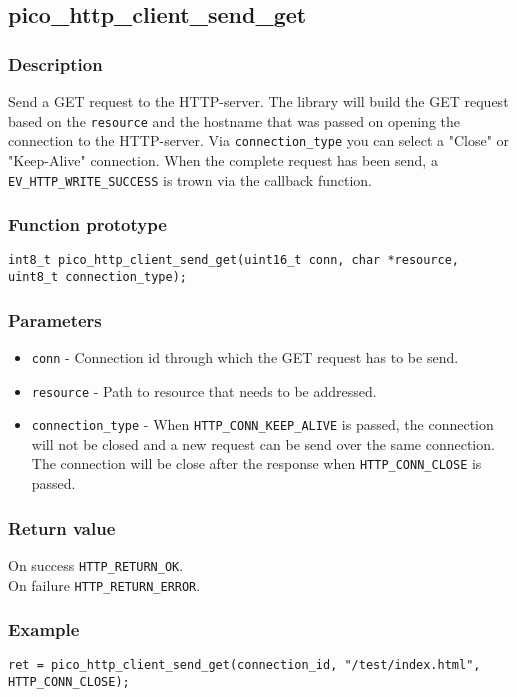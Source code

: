 \subsection{pico\_http\_client\_send\_get}
\subsubsection*{Description}
Send a GET request to the HTTP-server. The library will build the GET request based on the \texttt{resource} and the hostname that was passed on opening the connection to the HTTP-server. Via \texttt{connection\_type} you can select a "Close" or "Keep-Alive" connection. When the complete request has been send, a \texttt{EV\_HTTP\_WRITE\_SUCCESS} is trown via the callback function.

\subsubsection*{Function prototype}
\texttt{int8\_t pico\_http\_client\_send\_get(uint16\_t conn, char *resource, uint8\_t connection\_type);}

\subsubsection*{Parameters}
\begin{itemize}[noitemsep]
\item \texttt{conn} - Connection id through which the GET request has to be send.
\item \texttt{resource} - Path to resource that needs to be addressed.
\item \texttt{connection\_type} - When \texttt{HTTP\_CONN\_KEEP\_ALIVE} is passed, the connection will not be closed and a new request can be send over the same connection. The connection will be close after the response when \texttt{HTTP\_CONN\_CLOSE} is passed.
\end{itemize}

\subsubsection*{Return value}
On success \texttt{HTTP\_RETURN\_OK}.
\\On failure \texttt{HTTP\_RETURN\_ERROR}.

\subsubsection*{Example}
\begin{verbatim}
ret = pico_http_client_send_get(connection_id, "/test/index.html", HTTP_CONN_CLOSE);
\end{verbatim}

